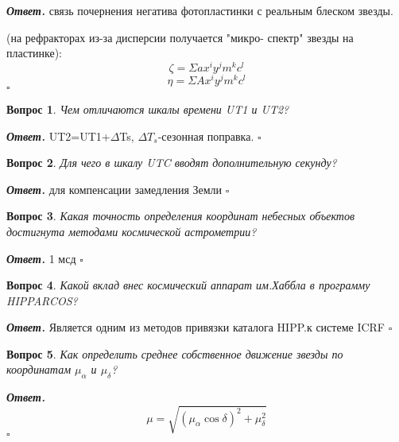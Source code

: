 \documentclass[12pt]{article}
\newtheorem{problem}{Вопрос}
\newenvironment{solution}[1][\it{Ответ}]{\textbf{#1. } }{$\square$}
\begin{document}
		\begin{solution}
			связь
			почернения негатива фотопластинки с
			реальным блеском звезды.
			
			(на рефракторах из-за дисперсии получается "микро-
			спектр" звезды на пластинке):
			$$\zeta = \Sigma ax^iy^jm^kc^l$$
			$$\eta = \Sigma Ax^iy^jm^kc^l$$
		\end{solution}
		
		\begin{problem}
			Чем отличаются шкалы времени UT1
			и UT2?
		\end{problem}
		
		\begin{solution}
			UT2=UT1+$\Delta$Ts, $\Delta T_s$-сезонная
		поправка.
		\end{solution}
		
		\begin{problem}
			Для чего в шкалу UTC вводят
			дополнительную секунду?
		\end{problem}
		
		\begin{solution}
			для
			компенсации замедления Земли
		\end{solution}
		
		\begin{problem}
			 Какая точность определения
			координат небесных объектов
			достигнута методами космической
			астрометрии?
		\end{problem}
		
		\begin{solution}
			1 мсд
		\end{solution}
		
		\begin{problem}
			Какой вклад внес космический
			аппарат им.Хаббла в программу
			HIPPARCOS? 
		\end{problem}
		
		\begin{solution}
			Является одним из методов
			привязки каталога HIPP.к системе ICRF
		\end{solution}
		
		\begin{problem}
			Как определить среднее собственное
			движение звезды по координатам $\mu_\alpha$ и $\mu_\delta$?
		\end{problem}
		
		\begin{solution}
			$$\mu = \sqrt{ (\mu_\alpha\cos\delta)^2+\mu_\delta^2}$$
		\end{solution}
		
\end{document}
